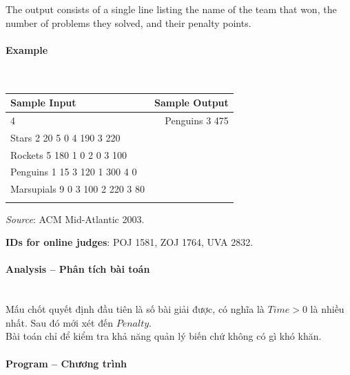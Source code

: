 \documentclass{article}
\begin{document}
The output consists of a single line listing the name of the team that won, the number of problems
they solved, and their penalty points.

\paragraph{Example}\mbox{} \\

\begin{table}[h]
    \centering
    \begin{tabular}{|l|r|}
        \hline
        \textbf{Sample Input} & \textbf{Sample Output} \\
        \hline
        4 &  Penguins 3 475 \\ 
        Stars 2 20 5 0 4 190 3 220   &  \\ 
        Rockets 5 180 1 0 2 0 3 100    &  \\ 
        Penguins 1 15 3 120 1 300 4 0    &  \\ 
        Marsupials 9 0 3 100 2 220 3 80    &  \\ 
            &  \\ \hline
    \end{tabular}
\end{table}

\textit{Source}: ACM Mid-Atlantic 2003.

\textbf{IDs for online judges}: POJ 1581, ZOJ 1764, UVA 2832.


\paragraph{Analysis -- Phân tích bài toán} \mbox{} \\

Mấu chốt quyết định đầu tiên là số bài giải được, có nghĩa là $Time > 0$ là nhiều nhất. Sau đó mới xét đến $Penalty$.\\

Bài toán chỉ để kiểm tra khả năng quản lý biến chứ không có gì khó khăn.

\paragraph{Program -- Chương trình} \mbox{} \\
\end{document}
